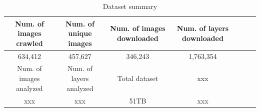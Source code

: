 

%
%

\begin{table}
	\centering
	\caption{Dataset summary} \label{tab-dataset-summary}
	\begin{tabular}{c|c|c|c|c|c|c}%
		\hline
		Num. of images crawled & Num. of unique images    & Num. of images downloaded  & Num. of layers downloaded \\
		\hline
		634,412                 & 457,627                 & 346,243                    & 1,763,354  \\
		\hline
		Num. of images analyzed & Num. of layers analyzed & Total dataset              &  xxx \\
		\hline
		xxx                     & xxx                     & 51TB                        & xxx  \\
		\hline
	\end{tabular}
\end{table}

